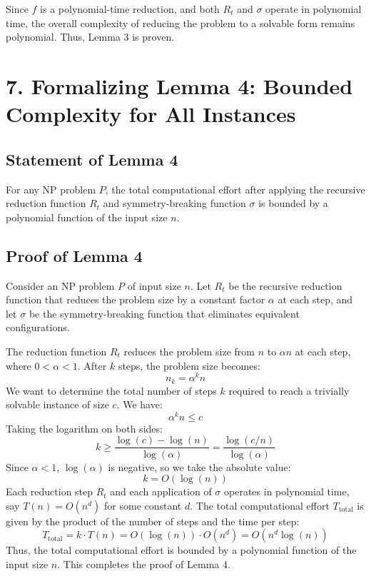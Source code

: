 \documentclass{article}
\begin{document}
Since $f$ is a polynomial-time reduction, and both $R_t$ and $\sigma$ operate in polynomial time, the overall complexity of reducing the problem to a solvable form remains polynomial. Thus, Lemma 3 is proven.

\section*{7. Formalizing Lemma 4: Bounded Complexity for All Instances}
\subsection*{Statement of Lemma 4}
For any NP problem $P$, the total computational effort after applying the recursive reduction function $R_t$ and symmetry-breaking function $\sigma$ is bounded by a polynomial function of the input size $n$.

\subsection*{Proof of Lemma 4}
Consider an NP problem $P$ of input size $n$. Let $R_t$ be the recursive reduction function that reduces the problem size by a constant factor $\alpha$ at each step, and let $\sigma$ be the symmetry-breaking function that eliminates equivalent configurations.

The reduction function $R_t$ reduces the problem size from $n$ to $\alpha n$ at each step, where $0 < \alpha < 1$. After $k$ steps, the problem size becomes:
\[
    n_k = \alpha^k n
\]
We want to determine the total number of steps $k$ required to reach a trivially solvable instance of size $c$. We have:
\[
    \alpha^k n \leq c
\]
Taking the logarithm on both sides:
\[
    k \geq \frac{\log(c) - \log(n)}{\log(\alpha)} = \frac{\log(c/n)}{\log(\alpha)}
\]
Since $\alpha < 1$, $\log(\alpha)$ is negative, so we take the absolute value:
\[
    k = O(\log(n))
\]
Each reduction step $R_t$ and each application of $\sigma$ operates in polynomial time, say $T(n) = O(n^d)$ for some constant $d$. The total computational effort $T_{\text{total}}$ is given by the product of the number of steps and the time per step:
\[
    T_{\text{total}} = k \cdot T(n) = O(\log(n)) \cdot O(n^d) = O(n^d \log(n))
\]
Thus, the total computational effort is bounded by a polynomial function of the input size $n$. This completes the proof of Lemma 4.
\end{document}
